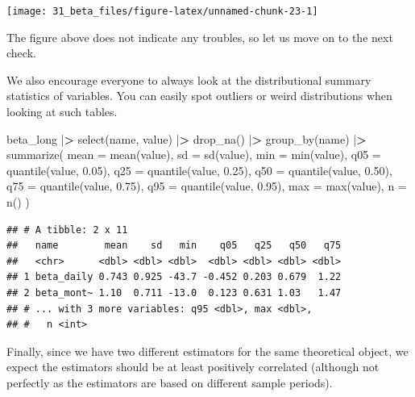 \documentclass[
]{book}
\newenvironment{Shaded}{\begin{snugshade}}{\end{snugshade}}
\newcommand{\AttributeTok}[1]{\textcolor[rgb]{0.61,0.61,0.61}{#1}}
\newcommand{\ErrorTok}[1]{\textcolor[rgb]{0.14,0.14,0.14}{\textbf{#1}}}
\newcommand{\FloatTok}[1]{\textcolor[rgb]{0.06,0.06,0.06}{#1}}
\newcommand{\FunctionTok}[1]{\textcolor[rgb]{0,0,0}{#1}}
\newcommand{\NormalTok}[1]{#1}
\newcommand{\SpecialCharTok}[1]{\textcolor[rgb]{0,0,0}{#1}}
\begin{document}
\begin{center}\texttt{[image: 31\_beta\_files/figure-latex/unnamed-chunk-23-1]} \end{center}

The figure above does not indicate any troubles, so let us move on to the next check.

We also encourage everyone to always look at the distributional summary statistics of variables. You can easily spot outliers or weird distributions when looking at such tables.

\begin{Shaded}
\begin{Highlighting}[]
\NormalTok{beta\_long }\SpecialCharTok{|}\ErrorTok{\textgreater{}}
  \FunctionTok{select}\NormalTok{(name, value) }\SpecialCharTok{|}\ErrorTok{\textgreater{}}
  \FunctionTok{drop\_na}\NormalTok{() }\SpecialCharTok{|}\ErrorTok{\textgreater{}}
  \FunctionTok{group\_by}\NormalTok{(name) }\SpecialCharTok{|}\ErrorTok{\textgreater{}}
  \FunctionTok{summarize}\NormalTok{(}
    \AttributeTok{mean =} \FunctionTok{mean}\NormalTok{(value),}
    \AttributeTok{sd =} \FunctionTok{sd}\NormalTok{(value),}
    \AttributeTok{min =} \FunctionTok{min}\NormalTok{(value),}
    \AttributeTok{q05 =} \FunctionTok{quantile}\NormalTok{(value, }\FloatTok{0.05}\NormalTok{),}
    \AttributeTok{q25 =} \FunctionTok{quantile}\NormalTok{(value, }\FloatTok{0.25}\NormalTok{),}
    \AttributeTok{q50 =} \FunctionTok{quantile}\NormalTok{(value, }\FloatTok{0.50}\NormalTok{),}
    \AttributeTok{q75 =} \FunctionTok{quantile}\NormalTok{(value, }\FloatTok{0.75}\NormalTok{),}
    \AttributeTok{q95 =} \FunctionTok{quantile}\NormalTok{(value, }\FloatTok{0.95}\NormalTok{),}
    \AttributeTok{max =} \FunctionTok{max}\NormalTok{(value),}
    \AttributeTok{n =} \FunctionTok{n}\NormalTok{()}
\NormalTok{  )}
\end{Highlighting}
\end{Shaded}

\begin{verbatim}
## # A tibble: 2 x 11
##   name        mean    sd   min    q05   q25   q50   q75
##   <chr>      <dbl> <dbl> <dbl>  <dbl> <dbl> <dbl> <dbl>
## 1 beta_daily 0.743 0.925 -43.7 -0.452 0.203 0.679  1.22
## 2 beta_mont~ 1.10  0.711 -13.0  0.123 0.631 1.03   1.47
## # ... with 3 more variables: q95 <dbl>, max <dbl>,
## #   n <int>
\end{verbatim}

Finally, since we have two different estimators for the same theoretical object, we expect the estimators should be at least positively correlated (although not perfectly as the estimators are based on different sample periods).
\end{document}

